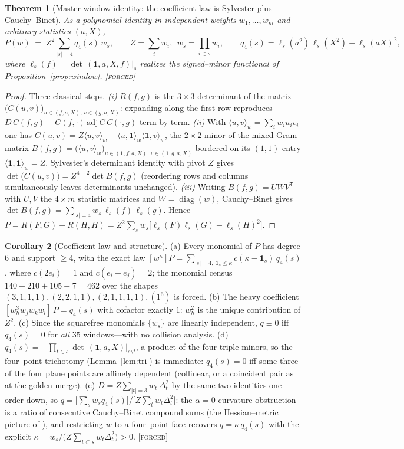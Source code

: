 \documentclass[11pt]{article}
\newtheorem{theorem}{Theorem}[section]
\theoremstyle{definition}
\newtheorem{corollary}[theorem]{Corollary}
\newcommand{\forcedtag}{{\scshape [forced]}}
\begin{document}
\begin{theorem}[Master window identity: the coefficient law is Sylvester plus Cauchy--Binet]\label{thm:master}
As a polynomial identity in independent weights $w_1,\dots,w_m$ and arbitrary statistics $(a,X)$,
\[
P(w)\;=\;Z^2\sum_{|s|=4}q_4(s)\,w_s,\qquad Z=\textstyle\sum_iw_i,\ \ w_s=\textstyle\prod_{i\in s}w_i,\qquad
q_4(s)=\ell_s(a^2)\,\ell_s(X^2)-\ell_s(aX)^2,
\]
where $\ell_s(f)=\det\,(\mathbf 1,a,X,f)|_s$ realizes the signed--minor functional of
Proposition~\ref{prop:window}. \forcedtag
\end{theorem}
\begin{proof}
Three classical steps. \emph{(i)} $R(f,g)$ is the $3\times3$ determinant of the matrix
$\bigl(C(u,v)\bigr)_{u\in(f,a,X),\,v\in(g,a,X)}$: expanding along the first row reproduces
$D\,C(f,g)-C(f,\cdot)\,\mathrm{adj}\,C\,C(\cdot,g)$ term by term. \emph{(ii)} With
$\langle u,v\rangle_w=\sum_iw_iu_iv_i$ one has
$C(u,v)=Z\langle u,v\rangle_w-\langle u,\mathbf 1\rangle_w\langle\mathbf 1,v\rangle_w$, the
$2\times2$ minor of the mixed Gram matrix
$B(f,g)=\bigl(\langle u,v\rangle_w\bigr)_{u\in(\mathbf 1,f,a,X),\,v\in(\mathbf 1,g,a,X)}$ bordered on
its $(1,1)$ entry $\langle\mathbf 1,\mathbf 1\rangle_w=Z$. Sylvester's determinant identity with
pivot $Z$ \cite{hj} gives $\det\bigl(C(u,v)\bigr)=Z^{4-2}\det B(f,g)$ (reordering rows and columns
simultaneously leaves determinants unchanged). \emph{(iii)} Writing $B(f,g)=UWV^{\mathsf T}$ with
$U,V$ the $4\times m$ statistic matrices and $W=\operatorname{diag}(w)$, Cauchy--Binet \cite{hj}
gives $\det B(f,g)=\sum_{|s|=4}w_s\,\ell_s(f)\,\ell_s(g)$. Hence
$P=R(F,G)-R(H,H)=Z^2\sum_sw_s\bigl[\ell_s(F)\ell_s(G)-\ell_s(H)^2\bigr]$.
\end{proof}
\begin{corollary}[Coefficient law and structure]\label{cor:windowlaw}
(a) Every monomial of $P$ has degree $6$ and support $\ge4$, with the exact law
$[w^\kappa]P=\sum_{|s|=4,\ \mathbf 1_s\le\kappa}c(\kappa-\mathbf 1_s)\,q_4(s)$, where $c(2e_i)=1$ and
$c(e_i+e_j)=2$; the monomial census $140+210+105+7=462$ over the shapes
$(3,1,1,1),(2,2,1,1),(2,1,1,1,1),(1^6)$ is forced. (b) The heavy coefficient
$[w_h^3w_jw_kw_l]\,P=q_4(s)$ with cofactor exactly $1$: $w_h^2$ is the unique contribution of $Z^2$.
(c) Since the squarefree monomials $\{w_s\}$ are linearly independent, $q\equiv0$ iff $q_4(s)=0$ for
\emph{all} $35$ windows---with no collision analysis. (d)
$q_4(s)=-\prod_{t\in s}\det\,(\mathbf 1,a,X)|_{s\setminus t}$, a product of the four triple minors,
so the four--point trichotomy (Lemma~\ref{lem:tri}) is immediate: $q_4(s)=0$ iff some three of the
four plane points are affinely dependent (collinear, or a coincident pair as at the golden merge).
(e) $D=Z\sum_{|t|=3}w_t\,\Delta_t^2$ by the same two identities one order down, so
$q=\bigl[\sum_sw_sq_4(s)\bigr]/\bigl[Z\sum_tw_t\Delta_t^2\bigr]$: the $\alpha=0$ curvature
obstruction is a ratio of consecutive Cauchy--Binet compound sums (the Hessian--metric picture of
\cite{shima}), and restricting $w$ to a four--point face recovers $q=\kappa\,q_4(s)$ with the
explicit $\kappa=w_s/\bigl(Z\sum_{t\subset s}w_t\Delta_t^2\bigr)>0$. \forcedtag
\end{corollary}
\end{document}
